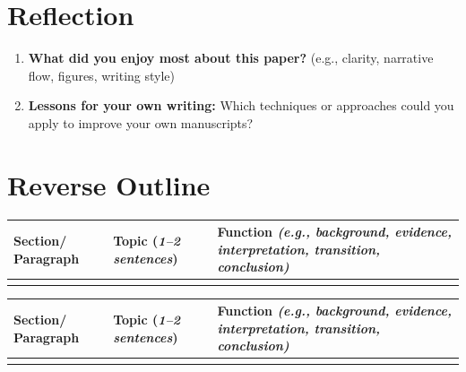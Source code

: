 \documentclass[10pt]{article}
\begin{document}
	\section*{Reflection}
	
	\begin{enumerate}[label=\arabic*.]
		\item \textbf{What did you enjoy most about this paper?} (e.g., clarity, narrative flow, figures, 
		writing style) \\
		\vspace{3em}
		\item \textbf{Lessons for your own writing:} Which techniques or approaches could you apply to 
		improve your own manuscripts? \\
		\vspace{3em}
	\end{enumerate}
	
	
	\pagebreak

	\section*{Reverse Outline}

	\noindent
		\begin{tabularx}{\textwidth}{|p{17mm}|X|X|}
		\hline
		\textbf{Section/ \newline Paragraph} & \textbf{Topic} \newline (\textit{1–2 sentences}) & \textbf{Function} \textit{(e.g., background, evidence, interpretation, transition, conclusion)}\\
		\hline
		\rule{0pt}{\dimexpr\pagegoal-\pagetotal-20pt-\baselineskip-2\arrayrulewidth\relax} & & \\ 
		\hline
	\end{tabularx}

\pagebreak 
	\noindent
		\begin{tabularx}{\textwidth}{|p{17mm}|X|X|}
		\hline
		\textbf{Section/ \newline Paragraph} & \textbf{Topic} \newline (\textit{1–2 sentences}) & \textbf{Function} \textit{(e.g., background, evidence, interpretation, transition, conclusion)}\\
		\hline
		\rule{0pt}{\dimexpr\pagegoal-\pagetotal-\baselineskip-2\arrayrulewidth\relax} & & \\ 
		\hline
	\end{tabularx}
	
\end{document}
